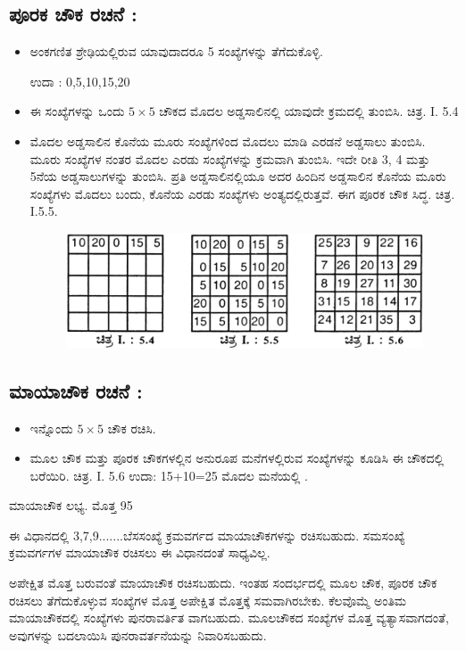 \subsection*{ಪೂರಕ ಚೌಕ ರಚನೆ :}

\begin{itemize}
	\item ಅಂಕಗಣಿತ ಶ್ರೇಢಿಯಲ್ಲಿರುವ ಯಾವುದಾದರೂ 5 ಸಂಖ್ಯೆಗಳನ್ನು ತೆಗೆದುಕೊಳ್ಳಿ.

	ಉದಾ : 0,5,10,15,20
	\item ಈ ಸಂಖ್ಯೆಗಳನ್ನು ಒಂದು $5 \times 5$ ಚೌಕದ ಮೊದಲ ಅಡ್ಡಸಾಲಿನಲ್ಲಿ ಯಾವುದೇ ಕ್ರಮದಲ್ಲಿ ತುಂಬಿಸಿ. ಚಿತ್ರ. I. 5.4
	\item ಮೊದಲ ಅಡ್ಡಸಾಲಿನ ಕೊನೆಯ ಮೂರು ಸಂಖ್ಯೆಗಳಿಂದ ಮೊದಲು ಮಾಡಿ ಎರಡನೆ ಅಡ್ಡಸಾಲು ತುಂಬಿಸಿ. ಮೂರು ಸಂಖ್ಯೆಗಳ ನಂತರ ಮೊದಲ ಎರಡು ಸಂಖ್ಯೆಗಳನ್ನು ಕ್ರಮವಾಗಿ ತುಂಬಿಸಿ. ಇದೇ ರೀತಿ 3, 4 ಮತ್ತು 5ನೆಯ ಅಡ್ಡಸಾಲುಗಳನ್ನು ತುಂಬಿಸಿ. ಪ್ರತಿ ಅಡ್ಡಸಾಲಿನಲ್ಲಿಯೂ ಅದರ ಹಿಂದಿನ ಅಡ್ಡಸಾಲಿನ ಕೊನೆಯ ಮೂರು ಸಂಖ್ಯೆಗಳು ಮೊದಲು ಬಂದು, ಕೊನೆಯ ಎರಡು ಸಂಖ್ಯೆಗಳು ಅಂತ್ಯದಲ್ಲಿರುತ್ತವೆ. ಈಗ ಪೂರಕ ಚೌಕ ಸಿದ್ಧ. ಚಿತ್ರ. I.5.5.
	\begin{figure}[H]
	\includegraphics[scale=.95]{src/figures/chap3/fig3-12.jpg}
	\end{figure}
\end{itemize}

\subsection*{ಮಾಯಾಚೌಕ ರಚನೆ :}

\begin{itemize}
	\item ಇನ್ನೊಂದು $5 \times 5$ ಚೌಕ ರಚಿಸಿ.
	\item ಮೂಲ ಚೌಕ ಮತ್ತು ಪೂರಕ ಚೌಕಗಳಲ್ಲಿನ ಅನುರೂಪ ಮನೆಗಳಲ್ಲಿರುವ ಸಂಖ್ಯೆಗಳನ್ನು ಕೂಡಿಸಿ ಈ ಚೌಕದಲ್ಲಿ ಬರೆಯಿರಿ. ಚಿತ್ರ. I. 5.6
	ಉದಾ: 15+10=25 ಮೊದಲ ಮನೆಯಲ್ಲಿ .
\end{itemize}

	ಮಾಯಾಚೌಕ ಲಭ್ಯ. ಮೊತ್ತ 95

	ಈ ವಿಧಾನದಲ್ಲಿ 3,7,9.......ಬೆಸಸಂಖ್ಯೆ ಕ್ರಮವರ್ಗದ ಮಾಯಾಚೌಕಗಳನ್ನು ರಚಿಸ\-ಬಹುದು. ಸಮಸಂಖ್ಯೆ ಕ್ರಮವರ್ಗಗಳ ಮಾಯಾಚೌಕ ರಚಿಸಲು ಈ ವಿಧಾನದಂತೆ ಸಾಧ್ಯವಿಲ್ಲ.

ಅಪೇಕ್ಷಿತ ಮೊತ್ತ ಬರುವಂತೆ ಮಾಯಾಚೌಕ ರಚಿಸಬಹುದು. ಇಂತಹ ಸಂದರ್ಭದಲ್ಲಿ ಮೂಲ ಚೌಕ, ಪೂರಕ ಚೌಕ ರಚಿಸಲು ತೆಗೆದುಕೊಳ್ಳುವ ಸಂಖ್ಯೆಗಳ ಮೊತ್ತ ಅಪೇಕ್ಷಿತ ಮೊತ್ತಕ್ಕೆ ಸಮವಾಗಿರಬೇಕು. ಕೆಲವೊಮ್ಮೆ ಅಂತಿಮ ಮಾಯಾಚೌಕದಲ್ಲಿ ಸಂಖ್ಯೆಗಳು ಪುನರಾವರ್ತಿತ ವಾಗಬಹುದು. ಮೂಲಚೌಕದ ಸಂಖ್ಯೆಗಳ ಮೊತ್ತ ವ್ಯತ್ಯಾಸವಾಗದಂತೆ, ಅವುಗಳನ್ನು \hbox{ಬದಲಾಯಿಸಿ} ಪುನರಾವರ್ತನೆಯನ್ನು ನಿವಾರಿಸಬಹುದು.

